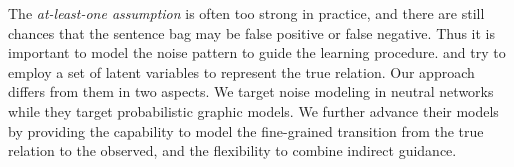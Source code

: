 The \emph{at-least-one assumption} is often too strong in practice, and there are still chances that the
sentence bag may be false positive or false negative. Thus it is important to model the noise pattern
to guide the learning procedure.
\cite{ritter2013modeling} and \cite{min2013distant} try to
employ a set of latent variables to represent the true relation. Our approach differs
from them in two aspects.
We target  noise modeling in neutral networks while they target probabilistic graphic models.
We further advance their models by providing the capability to model the fine-grained transition from the true relation to the observed, and
the flexibility to combine indirect guidance.





